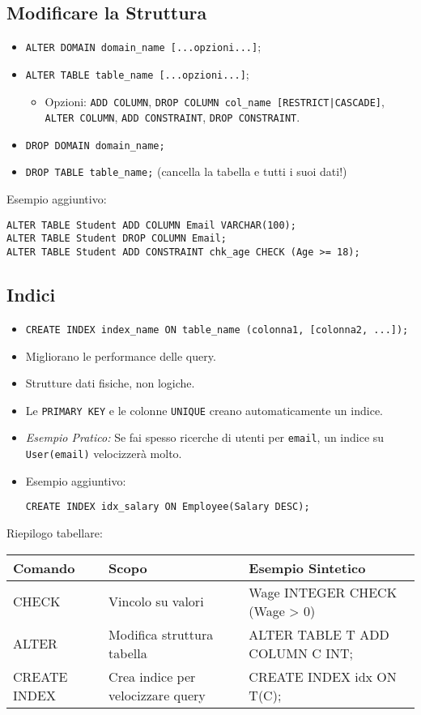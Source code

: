 	\subsection{Modificare la Struttura}
	\begin{itemize}
		\item \texttt{ALTER DOMAIN domain\_name [...opzioni...]};
		\item \texttt{ALTER TABLE table\_name [...opzioni...]};
		\begin{itemize}
			\item Opzioni: \texttt{ADD COLUMN}, \texttt{DROP COLUMN col\_name [RESTRICT|CASCADE]}, \texttt{ALTER COLUMN}, \texttt{ADD CONSTRAINT}, \texttt{DROP CONSTRAINT}.
		\end{itemize}
		\item \texttt{DROP DOMAIN domain\_name;}
		\item \texttt{DROP TABLE table\_name;} (cancella la tabella e tutti i suoi dati!)
	\end{itemize}
	Esempio aggiuntivo:
	\begin{verbatim}
ALTER TABLE Student ADD COLUMN Email VARCHAR(100);
ALTER TABLE Student DROP COLUMN Email;
ALTER TABLE Student ADD CONSTRAINT chk_age CHECK (Age >= 18);
	\end{verbatim}
	
	\subsection{Indici}
	\begin{itemize}
		\item \texttt{CREATE INDEX index\_name ON table\_name (colonna1, [colonna2, ...]);}
		\item Migliorano le performance delle query.
		\item Strutture dati fisiche, non logiche.
		\item Le \texttt{PRIMARY KEY} e le colonne \texttt{UNIQUE} creano automaticamente un indice.
		\item \textit{Esempio Pratico:} Se fai spesso ricerche di utenti per \texttt{email}, un indice su \texttt{User(email)} velocizzerà molto.
		\item Esempio aggiuntivo:
		\begin{verbatim}
CREATE INDEX idx_salary ON Employee(Salary DESC);
		\end{verbatim}
	\end{itemize}
	
	Riepilogo tabellare:
	\begin{center}
	\begin{tabular}{|l|l|l|}
	\hline
	\textbf{Comando} & \textbf{Scopo} & \textbf{Esempio Sintetico} \\
	\hline
	CHECK & Vincolo su valori & Wage INTEGER CHECK (Wage > 0) \\
	ALTER & Modifica struttura tabella & ALTER TABLE T ADD COLUMN C INT; \\
	CREATE INDEX & Crea indice per velocizzare query & CREATE INDEX idx ON T(C); \\
	\hline
	\end{tabular}
	\end{center}
	
